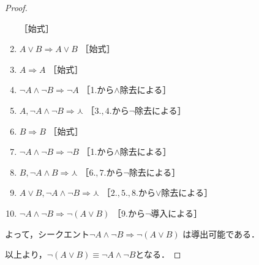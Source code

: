 \begin{proof}
\begin{enumerate}[1. ]
              \quad ［始式］
       \item $A \lor B \Longrightarrow A \lor B $ \quad ［始式］
       \item $A \Longrightarrow A$ \quad ［始式］
       \item $\lnot A \land \lnot B \Longrightarrow \lnot A $ \quad ［1.から$\land$除去による］
       \item $A,  \lnot A \land \lnot B \Longrightarrow \curlywedge$
              \quad ［$3., 4.$から$\lnot$除去による］
       \item $B \Longrightarrow B$ \quad ［始式］
       \item $\lnot A \land \lnot B \Longrightarrow \lnot B$ \quad ［1.から$\land$除去による］
       \item $B,  \lnot A \land B \Longrightarrow \curlywedge$ \quad ［$6., 7.$から$\lnot$除去による］
       \item $A \lor B , \lnot A \land \lnot B \Longrightarrow \curlywedge$
              \quad ［$2., 5., 8.$から$\lor$除去による］
       \item $\lnot A \land \lnot B \Longrightarrow \lnot ( A \lor B )$
              \quad ［9.から$\lnot$導入による］
     \end{enumerate}
     よって，シークエント$\lnot A \land \lnot B \Longrightarrow \lnot ( A \lor B )$
     は導出可能である．

     以上より，$\lnot ( A \lor B ) \equiv \lnot A \land \lnot B$となる．
   \end{proof}

